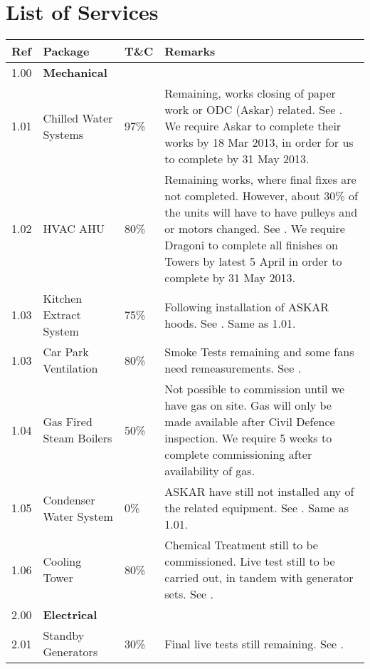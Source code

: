 \section*{List of Services}


\label{masterplan}
{\RaggedRight\small
\begin{longtable}{lllp{5.3cm}@{}}
\toprule
Ref	&Package	&T\&C	&Remarks   \\
\midrule
1.00	&\textbf{Mechanical}	&	&\\
1.01	&Chilled Water Systems	&97\%	&Remaining, works closing of paper work or ODC (Askar) related. See {chilledwater}. We require Askar to complete their works by 18 Mar 2013, in order for us to complete by 31 May 2013.\\

1.02	&HVAC AHU  & 80\%		&  Remaining works, where final fixes are not completed. However, about 30\% of the units will have to have pulleys and or motors changed. See {HVAC}. We require Dragoni to complete all finishes on Towers by latest 5 April in order to complete by 31 May 2013.\\

1.03    &Kitchen Extract System &75\%& Following installation of ASKAR hoods. See {kitchenextract}. Same as 1.01.\\

1.03	&Car Park Ventilation 	&80\%&Smoke Tests remaining and some fans need remeasurements. See {carparkventilation}. \\

1.04	&Gas Fired Steam Boilers &50\%&Not possible to commission until we have gas on site. Gas will only be made available after Civil Defence inspection. We require 5 weeks to complete commissioning  after availability of gas.\\

1.05	&Condenser Water System 	&0\%&ASKAR have still not installed any of the related equipment. See {chilledwaterconstraints}. Same as 1.01.   \\

1.06    &Cooling Tower &80\%&Chemical Treatment still to be commissioned. Live test still to be carried out, in tandem with generator sets. See {generators}.  \\
\midrule

2.00	&\textbf{Electrical}		&&\\
2.01	&Standby Generators	&30\%& Final live tests still remaining. See \sref{generators}. \\
	

\end{longtable}}
